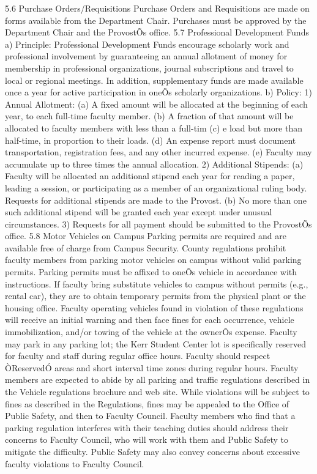 \documentclass[letterpaper, 11pt]{article}
\begin{document}
5.6 Purchase Orders/Requisitions
   Purchase Orders and Requisitions are made on forms available from the Department Chair.  Purchases must be approved by the Department Chair and the ProvostÕs office.
5.7 Professional Development Funds
a) Principle:  Professional Development Funds encourage scholarly work and professional involvement by guaranteeing an annual allotment of money for membership in professional organizations, journal subscriptions and travel to local or regional meetings.  In addition, supplementary funds are made available once a year for active participation in oneÕs scholarly organizations.
b) Policy:
1) Annual Allotment:
(a) A fixed amount will be allocated at the beginning of each year, to each full-time faculty member.
(b) A fraction of that amount will be allocated to faculty members with less than a full-tim
(c) e load but more than half-time, in proportion to their loads.
(d) An expense report must document transportation, registration fees, and any other incurred expense.
(e) Faculty may accumulate up to three times the annual allocation.
2) Additional Stipends:
(a) Faculty will be allocated an additional stipend each year for reading a paper, leading a session, or participating as a member of an organizational ruling body.  Requests for additional stipends are made to the Provost.
(b) No more than one such additional stipend will be granted each year except under unusual circumstances.
3) Requests for all payment should be submitted to the ProvostÕs office.
5.8 Motor Vehicles on Campus
   Parking permits are required and are available free of charge from Campus Security.  County regulations prohibit faculty members from parking motor vehicles on campus without valid parking permits.  Parking permits must be affixed to oneÕs vehicle in accordance with instructions.  If faculty bring substitute vehicles to campus without permits (e.g., rental car), they are to obtain temporary permits from the physical plant or the housing office.  Faculty operating vehicles found in violation of these regulations will receive an initial warning and then face fines for each occurrence, vehicle immobilization, and/or towing of the vehicle at the ownerÕs expense.  Faculty may park in any parking lot; the Kerr Student Center lot is specifically reserved for faculty and staff during regular office hours.  Faculty should respect ÒReservedÓ areas and short interval time zones during regular hours.
   Faculty members are expected to abide by all parking and traffic regulations described in the Vehicle regulations brochure and web site.  While violations will be subject to fines as described in the Regulations, fines may be appealed to the Office of Public Safety, and then to Faculty Council.  Faculty members who find that a parking regulation interferes with their teaching duties should address their concerns to Faculty Council, who will work with them and Public Safety to mitigate the difficulty.  Public Safety may also convey concerns about excessive faculty violations to Faculty Council.
\end{document}
